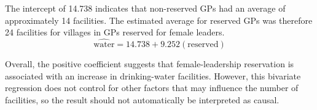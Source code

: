 \documentclass[12pt,letterpaper]{article}
\begin{document}
\begin{enumerate}
	The intercept of 14.738 indicates that non-reserved GPs had an average of approximately 14 facilities. The estimated average for reserved GPs was therefore 24 facilities for villages in GPs reserved for female leaders.
	\[
	\widehat{\text{water}} = 14.738 + 9.252(\text{reserved})
	\]
		\vspace{0.5cm}
	
	Overall, the positive coefficient suggests that female-leadership reservation is associated with an increase in drinking-water facilities. However, this bivariate regression does not control for other factors that may influence the number of facilities, so the result should not automatically be interpreted as causal.
\end{enumerate}


\end{document}
